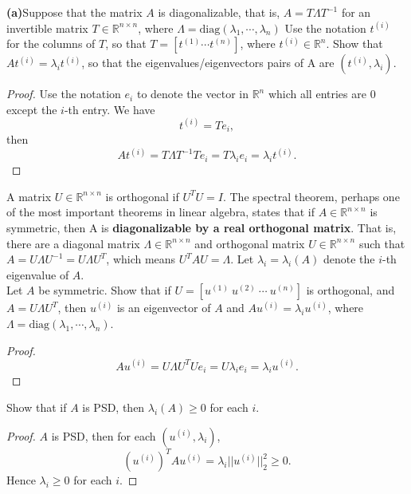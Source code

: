 \documentclass[reqno,twoside,a4paper,12pt]{amsart}
\begin{document}
\begin{enumerate}
        {\bf (a)}Suppose that the matrix $A$ is diagonalizable, that is, $A = T\Lambda T^{-1}$ for an invertible matrix $T \in \mathbb{R}^{n \times n}$, where $\Lambda = \text{diag}(\lambda_1, \cdots, \lambda_n)$ Use the notation $t^{(i)}$ for the columns of $T$, so that $T = [t^{(1)} \cdots t^{(n)}]$, where $t^{(i)} \in \mathbb{R}^n$. Show that $At^{(i)} = \lambda_i t^{(i)}$, so that the eigenvalues/eigenvectors pairs of A are $(t^{(i)}, \lambda_i)$.
        \begin{proof}
            Use the notation $e_i$ to denote the vector in $\mathbb{R}^n$ which all entries are $0$ except the $i$-th entry. We have 
            \[
                t^{(i)} = Te_i,
            \]
            then 
            \[
                At^{(i)} = T \Lambda T^{-1}Te_i = T\lambda_i e_i = \lambda_i t^{(i)}.
            \]
            
        \end{proof}
        \noindent A matrix $U \in \mathbb{R}^{n \times n}$ is orthogonal if $U^TU = I$. The spectral theorem, perhaps one of the most important theorems in linear algebra, states that if $A \in \mathbb{R}^{n \times n}$ is symmetric, then A is {\bf diagonalizable by a real orthogonal matrix}. That is, there are a diagonal matrix $\Lambda \in \mathbb{R}^{n \times n}$ and orthogonal matrix $U \in \mathbb{R}^{n \times n}$ such that $A = U \Lambda U^{-1} = U \Lambda U^T$, which means $U^T AU = \Lambda$. Let $\lambda_i = \lambda_i(A)$ denote the $i$-th eigenvalue of $A$.\\
         Let $A$ be symmetric. Show that if $U = [u^{(1)} \ u^{(2)} \ \cdots \ u^{(n)}]$ is orthogonal, and $A = U \Lambda U^T$, then $u^{(i)}$ is an eigenvector of $A$ and $Au^{(i)} = \lambda_i u^{(i)}$, where $\Lambda = \text{diag}(\lambda_1, \cdots, \lambda_n)$.
        \begin{proof}
            \[
                Au^{(i)} = U \Lambda U^T U e_i = U \lambda_i e_i = \lambda_i u^{(i)}.
            \]
        \end{proof}
        Show that if $A$ is PSD, then $\lambda_i(A) \geq 0$ for each $i$.
        \begin{proof}
            $A$ is PSD, then for each $(u^{(i)}, \lambda_i)$, 
            \[
                (u^{(i)})^T A u^{(i)} = \lambda_i ||u^{(i)}||_2^2 \geq 0.
            \]
            Hence $\lambda_i \geq 0$ for each $i$.
        \end{proof}



\end{enumerate}
\end{document}
